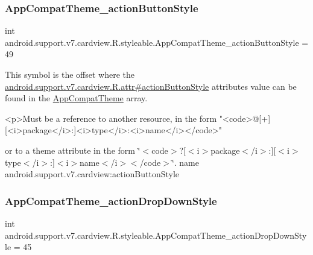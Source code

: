 \subsubsection{\texorpdfstring{App\+Compat\+Theme\+\_\+action\+Button\+Style}{AppCompatTheme\_actionButtonStyle}}
{\footnotesize\ttfamily int android.\+support.\+v7.\+cardview.\+R.\+styleable.\+App\+Compat\+Theme\+\_\+action\+Button\+Style = 49\hspace{0.3cm}{\ttfamily [static]}}

This symbol is the offset where the \hyperlink{classandroid_1_1support_1_1v7_1_1cardview_1_1R_1_1attr_ab251494f5d7882098a14ab434e23c38f}{android.\+support.\+v7.\+cardview.\+R.\+attr\#action\+Button\+Style} attribute\textquotesingle{}s value can be found in the \hyperlink{classandroid_1_1support_1_1v7_1_1cardview_1_1R_1_1styleable_a52e6f69f954ecc2622d72c0b4d298938}{App\+Compat\+Theme} array.

\begin{DoxyVerb}      <p>Must be a reference to another resource, in the form "<code>@[+][<i>package</i>:]<i>type</i>:<i>name</i></code>"
\end{DoxyVerb}
 or to a theme attribute in the form \char`\"{}$<$code$>$?\mbox{[}$<$i$>$package$<$/i$>$\+:\mbox{]}\mbox{[}$<$i$>$type$<$/i$>$\+:\mbox{]}$<$i$>$name$<$/i$>$$<$/code$>$\char`\"{}.  name android.\+support.\+v7.\+cardview\+:action\+Button\+Style \mbox{\label{classandroid_1_1support_1_1v7_1_1cardview_1_1R_1_1styleable_a56b8b8128966a67324fa382f40a941e8}} 
\subsubsection{\texorpdfstring{App\+Compat\+Theme\+\_\+action\+Drop\+Down\+Style}{AppCompatTheme\_actionDropDownStyle}}
{\footnotesize\ttfamily int android.\+support.\+v7.\+cardview.\+R.\+styleable.\+App\+Compat\+Theme\+\_\+action\+Drop\+Down\+Style = 45\hspace{0.3cm}{\ttfamily [static]}}

